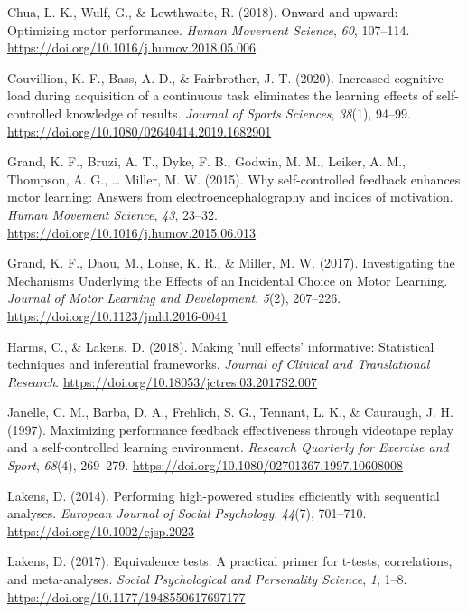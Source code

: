 \documentclass[
  english,
  man, donotrepeattitle,floatsintext]{apa7}
\newlength{\cslhangindent}
\newlength{\cslentryspacingunit} %
\newenvironment{CSLReferences}[2] %
 {%
  \setlength{\parindent}{0pt}
  \ifodd #1
  \let\oldpar\par
  \def\par{\hangindent=\cslhangindent\oldpar}
  \fi
  \setlength{\parskip}{#2\cslentryspacingunit}
 }%
 {}
\begin{document}
\begin{CSLReferences}{1}{0}
\leavevmode{}%
Chua, L.-K., Wulf, G., \& Lewthwaite, R. (2018). Onward and upward: Optimizing motor performance. \emph{Human Movement Science}, \emph{60}, 107--114. \url{https://doi.org/10.1016/j.humov.2018.05.006}

\leavevmode{}%
Couvillion, K. F., Bass, A. D., \& Fairbrother, J. T. (2020). Increased cognitive load during acquisition of a continuous task eliminates the learning effects of self-controlled knowledge of results. \emph{Journal of Sports Sciences}, \emph{38}(1), 94--99. \url{https://doi.org/10.1080/02640414.2019.1682901}

\leavevmode{}%
Grand, K. F., Bruzi, A. T., Dyke, F. B., Godwin, M. M., Leiker, A. M., Thompson, A. G., \ldots{} Miller, M. W. (2015). Why self-controlled feedback enhances motor learning: Answers from electroencephalography and indices of motivation. \emph{Human Movement Science}, \emph{43}, 23--32. \url{https://doi.org/10.1016/j.humov.2015.06.013}

\leavevmode{}%
Grand, K. F., Daou, M., Lohse, K. R., \& Miller, M. W. (2017). Investigating the Mechanisms Underlying the Effects of an Incidental Choice on Motor Learning. \emph{Journal of Motor Learning and Development}, \emph{5}(2), 207--226. \url{https://doi.org/10.1123/jmld.2016-0041}

\leavevmode{}%
Harms, C., \& Lakens, D. (2018). Making 'null effects' informative: Statistical techniques and inferential frameworks. \emph{Journal of Clinical and Translational Research}. \url{https://doi.org/10.18053/jctres.03.2017S2.007}

\leavevmode{}%
Janelle, C. M., Barba, D. A., Frehlich, S. G., Tennant, L. K., \& Cauraugh, J. H. (1997). Maximizing performance feedback effectiveness through videotape replay and a self-controlled learning environment. \emph{Research Quarterly for Exercise and Sport}, \emph{68}(4), 269--279. \url{https://doi.org/10.1080/02701367.1997.10608008}

\leavevmode{}%
Lakens, D. (2014). Performing high-powered studies efficiently with sequential analyses. \emph{European Journal of Social Psychology}, \emph{44}(7), 701--710. \url{https://doi.org/10.1002/ejsp.2023}

\leavevmode{}%
Lakens, D. (2017). Equivalence tests: A practical primer for t-tests, correlations, and meta-analyses. \emph{Social Psychological and Personality Science}, \emph{1}, 1--8. \url{https://doi.org/10.1177/1948550617697177}


\end{CSLReferences}
\end{document}
